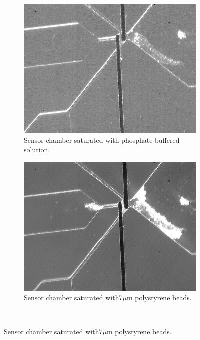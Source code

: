 \begin{figure}[h]
    \centering
    \begin{subfigure}[b]{0.45\textwidth}
        \centering
        \includegraphics[width=\textwidth]{images/IS_empty.jpg}
        \caption{Sensor chamber saturated with phosphate buffered solution.}
    \end{subfigure}
    \hfill
    \begin{subfigure}[b]{0.45\textwidth}
        \centering
        \includegraphics[width=\textwidth]{images/IS_particle_saturation.jpg}
        \caption{Sensor chamber saturated with7$\mu$m polystyrene beads.}
    \end{subfigure}
    \\

\end{figure}
